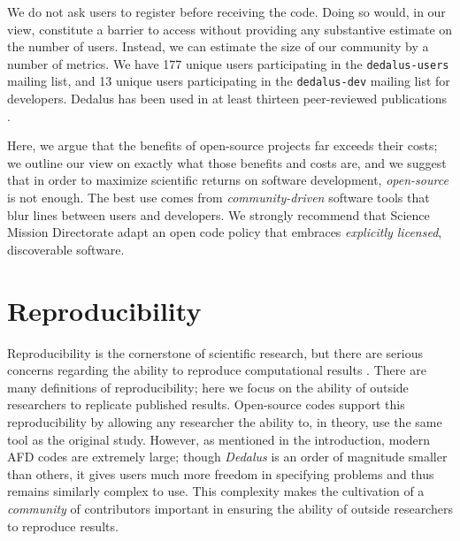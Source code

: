 \documentclass[12pt, titlepage]{aastex62}
\begin{document}
We do not ask users to register before receiving the code. Doing so would, in our view, constitute a barrier to access without providing any substantive estimate on the number of users. Instead, we can estimate the size of our community by a number of metrics. We have 177 unique users participating in the \texttt{dedalus-users} mailing list, and 13 unique users participating in the \texttt{dedalus-dev} mailing list for developers. Dedalus has been used in at least thirteen peer-reviewed publications \citep{2017PhRvF...2h3501A,PhysRevFluids.2.094804,2017ApJ...841....1C,2017ApJ...841....2C,2017MNRAS.466.2181L,2016ApJ...832...71L,2016JCoPh.325...53V,2016PhRvE..94e3206D,2016PhRvL.116j5004D,2016MNRAS.455.4274L,2015PhRvE..91f3016L,2014ApJ...797...94L}.

Here, we argue that the benefits of open-source projects far exceeds their costs; we outline our view on exactly what those benefits and costs are, and we suggest that in order to maximize scientific returns on software development, \emph{open-source} is not enough. The best use comes from \emph{community-driven} software tools that blur lines between users and developers. We strongly recommend that Science Mission Directorate adapt an open code policy that embraces \emph{explicitly licensed}, discoverable software. 

\section{Reproducibility}
\label{sec:repro}

Reproducibility is the cornerstone of scientific research, but there are serious concerns regarding the ability to reproduce computational results \citep[see][and references therein]{2012ICERM_REPORT}. There are many definitions of reproducibility; here we focus on the ability of outside researchers to replicate published results. Open-source codes support this reproducibility by allowing any researcher the ability to, in theory, use the same tool as the original study. However, as mentioned in the introduction, modern AFD codes are extremely large; though \emph{Dedalus} is an order of magnitude smaller than others, it gives users much more freedom in specifying problems and thus remains similarly complex to use. This complexity makes the cultivation of a \emph{community} of contributors important in ensuring the ability of outside researchers to reproduce results. 
\end{document}
